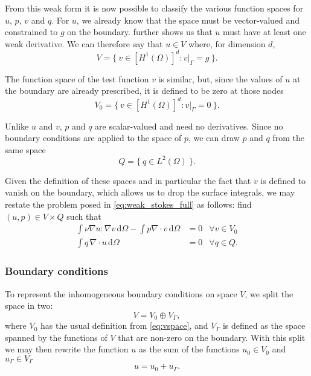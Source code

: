 \documentclass[thesis]{subfiles}
\begin{document}
From this weak form it is now possible to classify the various function spaces for $u$, $p$, $v$ and $q$.
For $u$, we already know that the space must be vector-valued and constrained to $g$ on the boundary.
 further shows us that $u$ must have at least one weak derivative.
We can therefore say that $u \in V$ where, for dimension $d$,
\begin{equation}
  V = \{ \ v \in [H^1(\Omega)]^d : v |_{\Gamma} = g \ \}.
\end{equation}

The function space of the test function $v$ is similar, but, since the values of $u$ at the boundary are already prescribed, it is defined to be zero at those nodes
\begin{equation} \label{eq:vspace}
  V_0 = \{\ v \in [H^1(\Omega)]^d : v|_{\Gamma} = 0 \ \}.
\end{equation}

Unlike $u$ and $v$, $p$ and $q$ are scalar-valued and need no derivatives.
Since no boundary conditions are applied to the space of $p$, we can draw $p$ and $q$ from the same space
\begin{equation}
  Q = \{ \ q \in L^2(\Omega) \ \}.
  \label{eq:stokes_pressure_space}
\end{equation}

Given the definition of these spaces and in particular the fact that $v$ is defined to vanish on the boundary, which allows us to drop the surface integrals, we may restate the problem posed in \cref{eq:weak_stokes_full} as follows: find $(u, p) \in V \times Q$ such that
\begin{equation} \label{eq:weak_stokes_no_surface_terms}
  \begin{aligned}
    \int \nu \nabla u : \nabla v \, \textrm{d}\Omega
    - \int p \nabla \cdot v \, \textrm{d}\Omega
    &= 0
    &\forall v \in V_0 \\
    \int q \, \nabla \cdot u \, \textrm{d}\Omega
    &= 0
    &\forall q \in Q.
  \end{aligned}
\end{equation}

\subsubsection{Boundary conditions}

To represent the inhomogeneous boundary conditions on space $V$, we split the space in two:
\begin{equation}
  V = V_0 \oplus V_\Gamma,
\end{equation}
where $V_0$ has the usual definition from \cref{eq:vspace}, and $V_\Gamma$ is defined as the space spanned by the functions of $V$ that are non-zero on the boundary.
With this split we may then rewrite the function $u$ as the sum of the functions $u_0 \in V_0$ and $u_\Gamma \in V_\Gamma$
\begin{equation}
  u = u_0 + u_\Gamma.
\end{equation}
\end{document}
